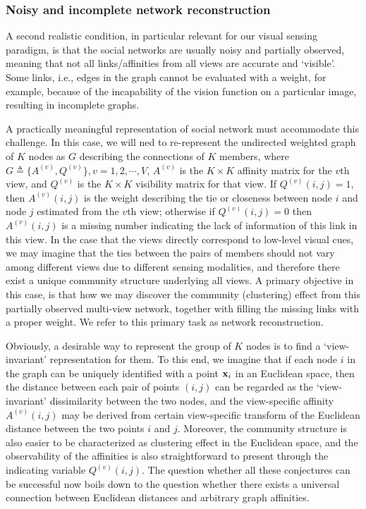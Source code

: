 \subsubsection{Noisy and incomplete network reconstruction}
\label{sec:reconstruct}

A second realistic condition, in particular relevant for our visual sensing paradigm, is that the social networks are usually noisy and partially observed, meaning that not all links/affinities from all views are accurate and `visible'. Some links, i.e., edges in the graph cannot be evaluated with a weight, for example, because of the incapability of the vision function on a particular image, resulting in incomplete graphs.

A practically meaningful representation of social network must accommodate this challenge. In this case, we will ned to re-represent the undirected weighted graph of $K$ nodes as $G$ describing the connections of $K$ members, where $G\triangleq\{A^{(v)}, Q^{(v)}\}, v=1,2,\cdots,V$, $A^{(v)}$ is the $K\times K$ affinity matrix for the $v$th view, and $Q^{(v)}$ is the $K\times K$ visibility matrix for that view. If $Q^{(v)}(i,j)=1$, then $A^{(v)}(i,j)$ is the weight describing the tie or closeness between node $i$ and node $j$ estimated from the $v$th view; otherwise if $Q^{(v)}(i,j)=0$ then $A^{(v)}(i,j)$ is a missing number indicating the lack of information of this link in this view. In the case that the views directly correspond to low-level visual cues, we may imagine that the ties between the pairs of members should not vary among different views due to different sensing modalities, and therefore there exist a unique community structure underlying all views. A primary objective in this case, is that how we may discover the community (clustering) effect from this partially observed multi-view network, together with filling the missing links with a proper weight. We refer to this primary task as network reconstruction.

Obviously, a desirable way to represent the group of $K$ nodes is to find a `view-invariant' representation for them. To this end, we imagine that if each node $i$ in the graph can be uniquely identified with a point ${\bf x}_i$ in an Euclidean space, then the distance between each pair of points $(i,j)$ can be regarded as the `view-invariant' dissimilarity between the two nodes, and the view-specific affinity $A^{(v)}(i,j)$ may be derived from certain view-specific transform of the Euclidean distance between the two points $i$ and $j$. Moreover, the community structure is also easier to be characterized as clustering effect in the Euclidean space, and the observability of the affinities is also straightforward to present through the indicating variable $Q^{(v)}(i,j)$. The question whether all these conjectures can be successful now boils down to the question whether there exists a universal connection between Euclidean distances and arbitrary graph affinities.

